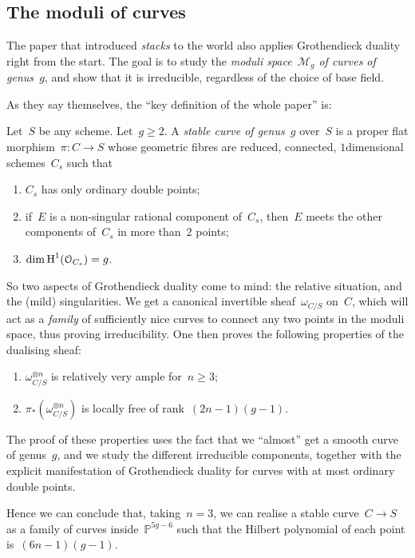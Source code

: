 \documentclass[10pt,a4paper]{article}
\begin{document}
\subsection{The moduli of curves}
The paper that introduced \emph{stacks} to the world \cite{deligne-mumford-irreducibility-moduli-of-curves} also applies Grothendieck duality right from the start. The goal is to study the \emph{moduli space~$\mathcal{M}_g$ of curves of genus~$g$}, and show that it is irreducible, regardless of the choice of base field.

As they say themselves, the ``key definition of the whole paper'' is:
\begin{definition}
  Let~$S$ be any scheme. Let~$g\geq 2$. A \emph{stable curve of genus~$g$} over~$S$ is a proper flat morphism~$\pi\colon C\to S$ whose geometric fibres are reduced, connected, $1$\dash dimensional schemes~$C_s$ such that
  \begin{enumerate}
    \item $C_s$ has only ordinary double points;
    \item if~$E$ is a non-singular rational component of~$C_s$, then~$E$ meets the other components of~$C_s$ in more than~$2$ points;
    \item $\dim\operatorname{H}^1(\mathcal{O}_{C_s})=g$.
  \end{enumerate}
\end{definition}
So two aspects of Grothendieck duality come to mind: the relative situation, and the (mild) singularities. We get a canonical invertible sheaf~$\omega_{C/S}$ on~$C$, which will act as a \emph{family} of sufficiently nice curves to connect any two points in the moduli space, thus proving irreducibility. One then proves the following properties of the dualising sheaf:
\begin{enumerate}
  \item $\omega_{C/S}^{\otimes n}$ is relatively very ample for~$n\geq 3$;
  \item $\pi_*(\omega_{C/S}^{\otimes n})$ is locally free of rank~$(2n-1)(g-1)$.
\end{enumerate}
The proof of these properties uses the fact that we ``almost'' get a smooth curve of genus~$g$, and we study the different irreducible components, together with the explicit manifestation of Grothendieck duality for curves with at most ordinary double points.

Hence we can conclude that, taking~$n=3$, we can realise a stable curve~$C\to S$ as a family of curves inside~$\mathbb{P}^{5g-6}$ such that the Hilbert polynomial of each point is~$(6n-1)(g-1)$.
\end{document}
